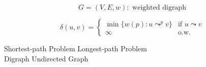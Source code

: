 
\begin{frame}{}
  {\centerline{}}
\end{frame}

\begin{frame}{}
  \begin{definition}
    \[
      G = (V, E, w): \text{ weighted digraph}
    \]

    \[
      \delta(u,v) = \begin{cases}
	\min \big\{ w(p): u \leadsto^{p} v \big\} & \text{if } u \leadsto v \\
	\infty	& \text{o.w.}
      \end{cases}
    \]
  \end{definition}

  \vspace{0.60cm}
  \begin{center}
  \end{center}

  \pause
  \begin{center}
    Shortest-path Problem  \quad Longest-path Problem \\[10pt]

    Digraph  Undirected Graph
  \end{center}
\end{frame}
